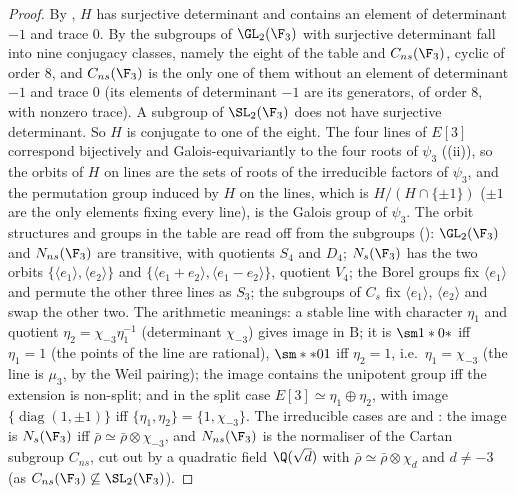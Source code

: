 \begin{proof}
By , $H$ has surjective determinant and contains an element of determinant $-1$ and trace $0$. By 
the subgroups of $\GL_2(\F_3)$ with surjective determinant fall into nine conjugacy classes, namely the eight of the table and $C_{ns}(\F_3)$, cyclic of
order $8$, and $C_{ns}(\F_3)$ is the only one of them without an element of determinant $-1$ and trace $0$ (its elements of determinant $-1$ are its
generators, of order $8$, with nonzero trace). A subgroup of $\SL_2(\F_3)$ does not have surjective determinant. So $H$ is conjugate to one of the
eight. The four lines of $E[3]$ correspond bijectively and Galois-equivariantly to the four roots of $\psi_3$ ((ii)), so
the orbits of $H$ on lines are the sets of roots of the irreducible factors of $\psi_3$, and the permutation group induced by $H$ on the lines, which is
$H/(H\cap\{\pm1\})$ ($\pm1$ are the only elements fixing every line), is the Galois group of $\psi_3$. The orbit structures and groups in the table are
read off from the subgroups (): $\GL_2(\F_3)$ and $N_{ns}(\F_3)$ are transitive, with quotients $S_4$ and $D_4$; $N_s(\F_3)$ has the two orbits
$\{\langle e_1\rangle,\langle e_2\rangle\}$ and $\{\langle e_1+e_2\rangle,\langle e_1-e_2\rangle\}$, quotient $V_4$; the Borel groups fix $\langle e_1\rangle$ and permute the other three lines
as $S_3$; the subgroups of $C_s$ fix $\langle e_1\rangle$, $\langle e_2\rangle$ and swap the other two. The arithmetic meanings: a stable line with character $\eta_1$ and
quotient $\eta_2=\chi_{-3}\eta_1^{-1}$ (determinant $\chi_{-3}$) gives image in $\mathrm B$; it is $\sm1*0*$ iff $\eta_1=1$ (the points of the line are rational), $\sm**01$ iff
$\eta_2=1$, i.e.\ $\eta_1=\chi_{-3}$ (the line is $\mu_3$, by the Weil pairing); the image contains the unipotent group iff the extension is non-split; and in
the split case $E[3]\simeq\eta_1\oplus\eta_2$, with image $\{\operatorname{diag}(1,\pm1)\}$ iff $\{\eta_1,\eta_2\}=\{1,\chi_{-3}\}$. The irreducible cases are 
and : the image is $N_s(\F_3)$ iff $\bar\rho\simeq\bar\rho\otimes\chi_{-3}$, and $N_{ns}(\F_3)$ is the normaliser of the Cartan subgroup $C_{ns}$, cut out
by a quadratic field $\Q(\sqrt d)$ with $\bar\rho\simeq\bar\rho\otimes\chi_d$ and $d\ne-3$ (as $C_{ns}(\F_3)\not\subseteq\SL_2(\F_3)$).
\end{proof}

